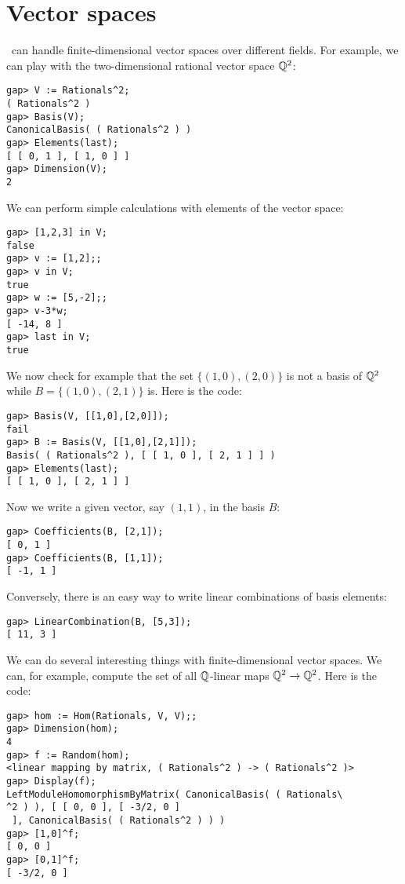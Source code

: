 \section{Vector spaces}

\GAP~can handle finite-dimensional vector spaces over different fields. For example, 
we can play with the two-dimensional rational 
vector space $\mathbb{Q}^2$:
\begin{lstlisting}
gap> V := Rationals^2;
( Rationals^2 )
gap> Basis(V);
CanonicalBasis( ( Rationals^2 ) )
gap> Elements(last);
[ [ 0, 1 ], [ 1, 0 ] ]
gap> Dimension(V);
2
\end{lstlisting}
We can perform simple calculations with
elements of the vector space:
\begin{lstlisting}
gap> [1,2,3] in V;
false
gap> v := [1,2];;
gap> v in V;
true
gap> w := [5,-2];;
gap> v-3*w;
[ -14, 8 ]
gap> last in V;
true  
\end{lstlisting}
We now check for example
that the set $\{(1,0),(2,0)\}$ is not a basis of $\mathbb{Q}^2$ while
$B=\{(1,0),(2,1)\}$ is. Here is the code:
\begin{lstlisting}
gap> Basis(V, [[1,0],[2,0]]);
fail
gap> B := Basis(V, [[1,0],[2,1]]);
Basis( ( Rationals^2 ), [ [ 1, 0 ], [ 2, 1 ] ] )
gap> Elements(last);
[ [ 1, 0 ], [ 2, 1 ] ]
\end{lstlisting}
Now we write a given vector, say 
$(1,1)$, in the basis $B$: 
\begin{lstlisting}
gap> Coefficients(B, [2,1]);
[ 0, 1 ]
gap> Coefficients(B, [1,1]);
[ -1, 1 ]
\end{lstlisting}
Conversely, 
there is an easy way to write linear combinations
of basis elements: 
\begin{lstlisting}
gap> LinearCombination(B, [5,3]);
[ 11, 3 ]    
\end{lstlisting}

We can do several interesting things with
finite-dimensional vector spaces. We can, for example, 
compute the set of all $\mathbb{Q}$-linear maps
$\mathbb{Q}^2\to\mathbb{Q}^2$. Here is the code:

\begin{lstlisting}
gap> hom := Hom(Rationals, V, V);;
gap> Dimension(hom);
4
gap> f := Random(hom);
<linear mapping by matrix, ( Rationals^2 ) -> ( Rationals^2 )>
gap> Display(f);
LeftModuleHomomorphismByMatrix( CanonicalBasis( ( Rationals\
^2 ) ), [ [ 0, 0 ], [ -3/2, 0 ]
 ], CanonicalBasis( ( Rationals^2 ) ) )
gap> [1,0]^f;
[ 0, 0 ]
gap> [0,1]^f;
[ -3/2, 0 ]
\end{lstlisting}

